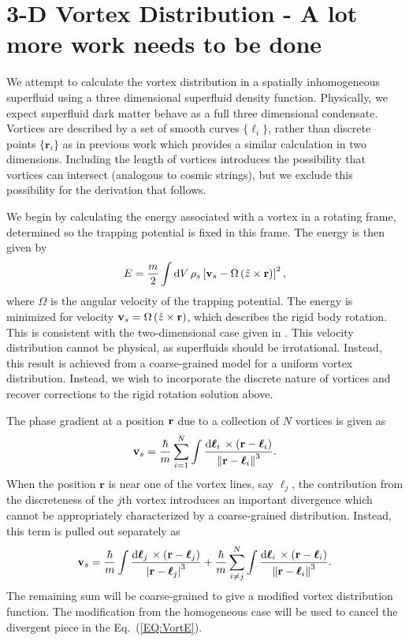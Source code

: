 \documentclass[onecolumn,nofootinbib,superscriptaddress]{revtex4}
\newcommand{\dd}[1]{\mathrm{d}#1\,}
\newcommand{\bfell}{\boldsymbol \ell}
\begin{document}
\section{3-D Vortex Distribution - A lot more work needs to be done}

We attempt to calculate the vortex distribution in a spatially inhomogeneous superfluid using a three dimensional superfluid density function.  Physically, we expect superfluid dark matter behave as a full three dimensional condensate.  Vortices are described by a set of smooth curves $\{\boldsymbol{\ell}_i\}$, rather than discrete points $\{\boldsymbol{r}_i\}$ as in previous work \cite{Sheehy:2004} which provides a similar calculation in two dimensions.  Including the length of vortices introduces the possibility that vortices can intersect (analogous to cosmic strings), but we exclude this possibility for the derivation that follows.

We begin by calculating the energy associated with a vortex in a rotating frame, determined so the trapping potential is fixed in this frame. The energy is then given by
\begin{equation}
E = \frac{m}{2}\int \dd{V} \rho_s \left[{\bf v}_s - \Omega\left(\hat{z}\times\bf{r}\right)\right]^2,\label{EQ:VortE}
\end{equation}
where $\Omega$ is the angular velocity of the trapping potential.  The energy is minimized for velocity ${\bf v}_s = \Omega\left(\hat{z}\times\bf{r}\right)$, which describes the rigid body rotation.  This is consistent with the two-dimensional case given in \cite{Sheehy:2004}.  This velocity distribution cannot be physical, as superfluids should be irrotational.  Instead, this result is achieved from a coarse-grained model for a uniform vortex distribution.  Instead, we wish to incorporate the discrete nature of vortices and recover corrections to the rigid rotation solution above.


The phase gradient at a position ${\bf r}$ due to a collection of $N$ vortices is given as
\begin{equation}
{\bf v}_s = \frac{\hbar}{m}\sum_{i=1}^N \int \frac{\dd{\bfell_i}\times\left({\bf r} - \bfell_i\right)}{\left\|{\bf r} - \bfell_i\right\|^3}.
\end{equation}
When the position $\boldsymbol{r}$ is near one of the vortex lines, say $\bfell_j$, the contribution from the discreteness of the $j$th vortex introduces an important divergence which cannot be appropriately characterized by a coarse-grained distribution.  Instead, this term is pulled out separately as
\begin{equation}
{\bf v}_s = \frac{\hbar}{m}\int \frac{\dd{\bfell_j}\times\left({\bf r} - \bfell_j\right)}{\left|{\bf r} - \bfell_j\right|^3} + \frac{\hbar}{m}\sum_{i\neq j}^N \int \frac{\dd{\bfell_i}\times\left({\bf r} - \bfell_i\right)}{\left\|{\bf r} - \bfell_i\right\|^3}.\label{EQ:DcompVel}
\end{equation}
The remaining sum will be coarse-grained to give a modified vortex distribution function.  The modification from the homogeneous case will be used to cancel the divergent piece in the Eq.~(\ref{EQ:VortE}).
\end{document}
